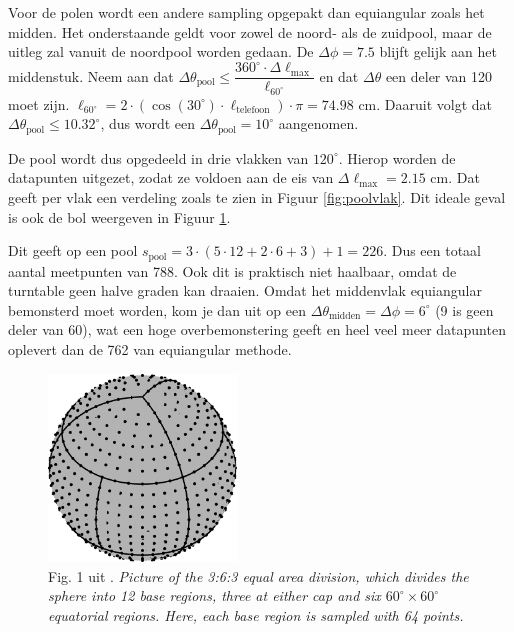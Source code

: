 Voor de polen wordt een andere sampling opgepakt dan equiangular zoals het midden. Het onderstaande geldt voor zowel de noord- als de zuidpool, maar de uitleg zal vanuit de noordpool worden gedaan. De $\Delta\phi=7.5$ blijft gelijk aan het middenstuk. Neem aan dat $\Delta\theta_\text{pool}\leq\dfrac{360^\circ\cdot\Delta\ell_\text{max}}{\ell_{60^\circ}}$ en dat $\Delta\theta$ een deler van 120 moet zijn. $\ell_{60^\circ}=2\cdot(\cos(30^\circ)\cdot\ell_\text{telefoon})\cdot\pi=74.98$ cm. Daaruit volgt dat $\Delta\theta_\text{pool}\leq10.32^\circ$, dus wordt een $\Delta\theta_\text{pool}=10^\circ$ aangenomen.

De pool wordt dus opgedeeld in drie vlakken van $120^\circ$. Hierop worden de datapunten uitgezet, zodat ze voldoen aan de eis van $\Delta\ell_\text{max}=2.15$ cm. Dat geeft per vlak een verdeling zoals te zien in Figuur \ref{fig:poolvlak}. Dit ideale geval is ook de bol weergeven in Figuur \ref{fig:IGLOO}.

Dit geeft op een pool $s_\text{pool}=3\cdot(5\cdot12+2\cdot6+3)+1=226$. Dus een totaal aantal meetpunten van 788. Ook dit is praktisch niet haalbaar, omdat de turntable geen halve graden kan draaien. Omdat het middenvlak equiangular bemonsterd moet worden, kom je dan uit op een $\Delta\theta_\text{midden}=\Delta\phi=6^\circ$ (9 is geen deler van 60), wat een hoge overbemonstering geeft en heel veel meer datapunten oplevert dan de 762 van equiangular methode.

\begin{figure}[h]
    \centering
    \includegraphics[width=5cm]{afbeeldingen/Directivity_IGLOO.png}
    \caption{Fig. 1 uit \cite{Zhang2012575}. \textit{Picture of the 3:6:3 equal area division, which divides the sphere into 12 base regions, three at either cap and six $60^\circ\times60^\circ$ equatorial regions. Here, each base region is sampled with 64 points.}}
    \label{fig:IGLOO}
\end{figure}

